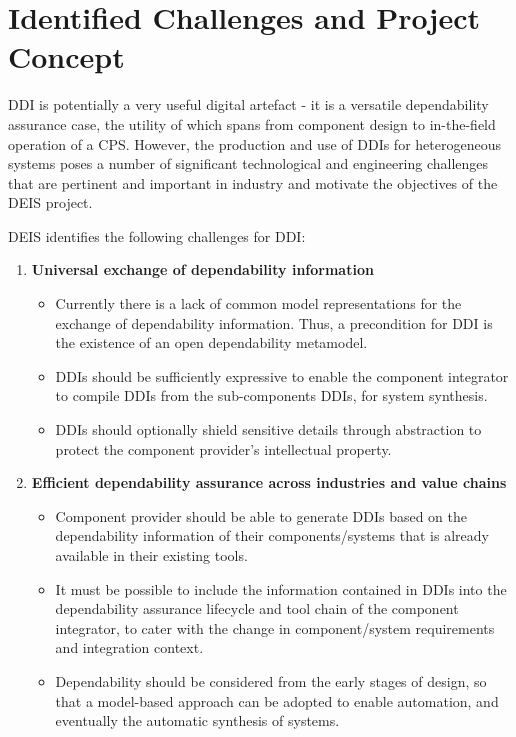 \section{Identified Challenges and Project Concept}
DDI is potentially a very useful digital artefact - it is a versatile dependability assurance case, the utility of which spans from component design to in-the-field operation of a CPS. However, the production and use of DDIs for heterogeneous systems poses a number of significant technological and engineering challenges that are pertinent and important in industry and motivate the objectives of the DEIS project. 

DEIS identifies the following challenges for DDI:

\begin{enumerate}
	\item \textbf{Universal exchange of dependability information}
		\begin{itemize}
			\item Currently there is a lack of common model representations for the exchange of dependability information. Thus, a precondition for DDI is the existence of an open dependability metamodel. 
			\item DDIs should be sufficiently expressive to enable the component integrator to compile DDIs from the sub-components DDIs, for system synthesis.
			\item DDIs should optionally shield sensitive details through abstraction to protect the component provider's intellectual property. 
		\end{itemize}
	\item \textbf{Efficient dependability assurance across industries and value chains}
		\begin{itemize}
			\item Component provider should be able to generate DDIs based on the dependability information of their components/systems that is already available in their existing tools.
			\item It must be possible to include the information contained in DDIs into the dependability assurance lifecycle and tool chain of the component integrator, to cater with the change in component/system requirements and integration context.
			\item Dependability should be considered from the early stages of design, so that a model-based approach can be adopted to enable automation, and eventually the automatic synthesis of systems.
		\end{itemize}

\end{enumerate}
